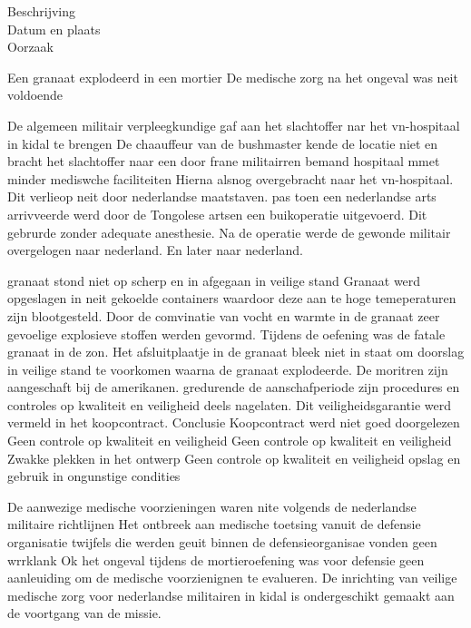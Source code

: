 {{{{{{{{{\begin{description}
\item[Beschrijving]
\item[Datum en plaats] 
\item[Oorzaak]
\end{description}
Een granaat explodeerd in een mortier
De medische zorg na het ongeval was neit voldoende


De algemeen militair verpleegkundige gaf aan het slachtoffer nar het vn-hospitaal in kidal te brengen
De chaauffeur van de bushmaster kende de locatie niet  en bracht het slachtoffer naar een door frane militairren bemand hospitaal mmet minder mediswche faciliteiten
Hierna alsnog overgebracht naar het vn-hospitaal.
Dit verlieop  neit door nederlandse maatstaven.
pas toen een nederlandse arts arrivveerde werd door de Tongolese artsen een buikoperatie uitgevoerd.
Dit gebrurde zonder adequate anesthesie.
Na de operatie werde de gewonde militair overgelogen naar nederland. En later naar nederland.


granaat stond niet op scherp en in afgegaan in veilige stand
Granaat werd opgeslagen in neit gekoelde containers waardoor deze aan te hoge temeperaturen zijn blootgesteld.
Door de comvinatie van vocht en warmte in de granaat zeer gevoelige explosieve stoffen werden gevormd.
Tijdens de oefening was de fatale granaat in de zon.
Het afsluitplaatje in de granaat bleek niet in staat om doorslag in veilige stand te voorkomen waarna de granaat explodeerde.
De moritren zijn aangeschaft bij de amerikanen. gredurende de aanschafperiode zijn procedures en controles op kwaliteit en veiligheid deels nagelaten.
Dit veiligheidsgarantie werd vermeld in het koopcontract.
Conclusie
Koopcontract werd niet goed doorgelezen
Geen controle op kwaliteit en veiligheid
Geen controle op kwaliteit en veiligheid
Zwakke plekken in het ontwerp
Geen controle op kwaliteit en veiligheid
opslag en gebruik in ongunstige condities

De aanwezige medische voorzieningen waren nite volgends de nederlandse militaire richtlijnen
Het ontbreek aan medische toetsing vanuit de defensie organisatie
twijfels die werden geuit binnen de defensieorganisae vonden geen wrrklank
Ok het ongeval tijdens de mortieroefening was voor defensie geen aanleuiding om de medische voorzienignen te evalueren.
De inrichting van veilige medische zorg voor nederlandse militairen in kidal is ondergeschikt gemaakt aan de voortgang van de missie.


}}}}}}}}}
